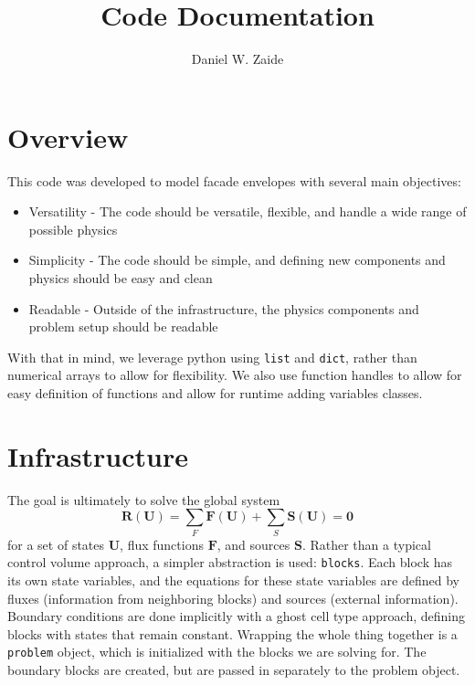 \documentclass[11pt]{article}
\title{Code Documentation}
\author{Daniel W. Zaide}
\begin{document}
\maketitle

\section{Overview}

This code was developed to model facade envelopes with several main objectives:
\begin{itemize}
\item Versatility - The code should be versatile, flexible, and handle a wide range of possible physics
\item Simplicity - The code should be simple, and defining new components and physics should be easy and clean
\item Readable - Outside of the infrastructure, the physics components and problem setup should be readable
\end{itemize}

With that in mind, we leverage python using \lstinline{list} and \lstinline{dict}, rather than numerical arrays to allow for flexibility. We also use function handles to allow for easy definition of functions and allow for runtime adding variables classes.

\section{Infrastructure}
The goal is ultimately to solve the global system
\begin{equation}
\mathbf{R}(\mathbf{U}) = \sum_F \mathbf{F}(\mathbf{U}) + \sum_S \mathbf{S}(\mathbf{U}) = \mathbf{0}
\end{equation}
for a set of states $\mathbf{U}$, flux functions $\mathbf{F}$, and sources $\mathbf{S}$. Rather than a typical control volume approach, a simpler abstraction is used: \lstinline{blocks}. Each block has its own state variables, and the equations for these state variables are defined by fluxes (information from neighboring blocks) and sources (external information). Boundary conditions are done implicitly with a ghost cell type approach, defining blocks with states that remain constant. Wrapping the whole thing together is a \lstinline{problem} object, which is initialized with the blocks we are solving for. The boundary blocks are created, but are passed in separately to the problem object.
\end{document}
